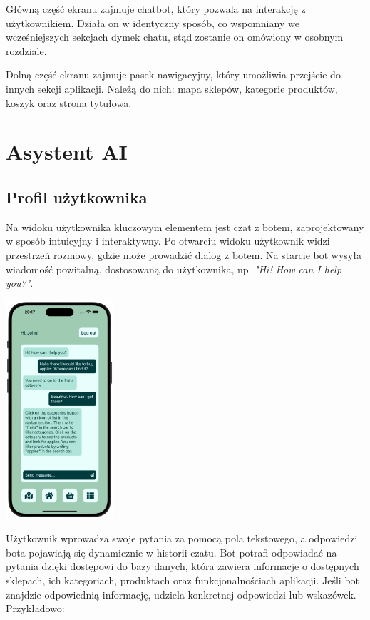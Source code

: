 Główną część ekranu zajmuje chatbot, który pozwala na interakcję z użytkownikiem. Działa on w identyczny sposób, co wspomniany we wcześniejszych sekcjach dymek chatu, stąd zostanie on omówiony w osobnym rozdziale.

Dolną część ekranu zajmuje pasek nawigacyjny, który umożliwia przejście do innych sekcji aplikacji. Należą do nich: mapa sklepów, kategorie produktów, koszyk oraz strona tytułowa.

\section{Asystent AI}

\subsection{Profil użytkownika}

Na widoku użytkownika kluczowym elementem jest czat z botem, zaprojektowany w sposób intuicyjny i interaktywny. Po otwarciu widoku użytkownik widzi przestrzeń rozmowy, gdzie może prowadzić dialog z botem. Na starcie bot wysyła wiadomość powitalną, dostosowaną do użytkownika, np. \emph{"Hi! How can I help you?"}.  

\begin{center}
    \includegraphics[width=0.3\textwidth]{images/front/user_chat.png}
\end{center}

Użytkownik wprowadza swoje pytania za pomocą pola tekstowego, a odpowiedzi bota pojawiają się dynamicznie w historii czatu. Bot potrafi odpowiadać na pytania dzięki dostępowi do bazy danych, która zawiera informacje o dostępnych sklepach, ich kategoriach, produktach oraz funkcjonalnościach aplikacji. Jeśli bot znajdzie odpowiednią informację, udziela konkretnej odpowiedzi lub wskazówek. Przykładowo:  

